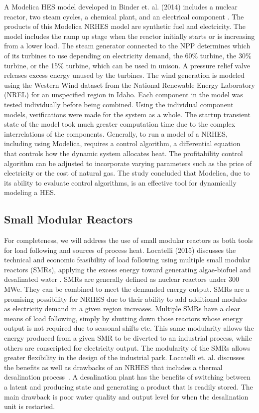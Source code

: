 \documentclass{article}                                                                           %
\begin{document}
\begin{linenumbers}
A Modelica HES model developed in Binder et. al. (2014) includes a nuclear reactor, two steam cycles, a chemical plant, and an electrical component \cite{Binder2014}. The products of this Modelica NRHES model are synthetic fuel and electricity. The model includes the ramp up stage when the reactor initially starts or is increasing from a lower load. The steam generator connected to the NPP determines which of its turbines to use depending on electricity demand, the 60\% turbine, the 30\% turbine, or the 15\% turbine, which can be used in unison. A pressure relief valve releases excess energy unused by the turbines. The wind generation is modeled using the Western Wind dataset from the National Renewable Energy Laboratory (NREL) for an unspecified region in Idaho. Each component in the model was tested individually before being combined. Using the individual component models, verifications were made for the system as a whole. The startup transient state of the model took much greater computation time due to the complex interrelations of the components. Generally, to run a model of a NRHES, including using Modelica, requires a control algorithm, a differential equation that controls how the dynamic system allocates heat. The profitability control algorithm can be adjusted to incorporate varying parameters such as the price of electricity or the cost of natural gas. The study concluded that Modelica, due to its ability to evaluate control algorithms, is an effective tool for dynamically modeling a HES.

\subsection{Small Modular Reactors}
For completeness, we will address the use of small modular reactors as both tools for load following and sources of process heat. Locatelli (2015) discusses the technical and economic feasibility of load following using multiple small modular reactors (SMRs), applying the excess energy toward generating algae-biofuel and desalinated water \cite{Locatelli2015}. SMRs are generally defined as nuclear reactors under 300 MWe. They can be combined to meet the demanded energy output. SMRs are a promising possibility for NRHES due to their ability to add additional modules as electricity demand in a given region increases. Multiple SMRs have a clear means of load following, simply by shutting down those reactors whose energy output is not required due to seasonal shifts etc. This same modularity allows the energy produced from a given SMR to be diverted to an industrial process, while others are conscripted for electricity output. The modularity of the SMRs allows greater flexibility in the design of the industrial park.  Locatelli et. al. discusses the benefits as well as drawbacks of an NRHES that includes a thermal desalination process~\cite {Locatelli2015}. A desalination plant has the benefits of switching between a latent and producing state and generating a product that is readily stored. The main drawback is poor water quality and output level for when the desalination unit is restarted.


\end{linenumbers}
\end{document}
